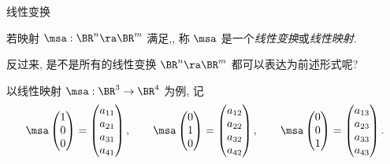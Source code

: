 \begin{frame}{线性变换\noexer}
	\onslide<+->
	\begin{definition}
		若映射 $\msa:\BR^n\ra\BR^m$ 满足,, 称 $\msa$ 是一个\emph{线性变换}或\emph{线性映射}.
	\end{definition}
	\onslide<+->
	反过来, 是不是所有的线性变换 $\BR^n\ra\BR^m$ 都可以表达为前述形式呢?

	\onslide<+->
	以线性映射 $\msa:\BR^3\to\BR^4$ 为例,
	\onslide<+->
	记
	\[\msa\begin{pmatrix}
		1\\0\\0
	\end{pmatrix}=\begin{pmatrix}
		a_{11}\\a_{21}\\a_{31}\\a_{41}
	\end{pmatrix},\qquad
	\msa\begin{pmatrix}
		0\\1\\0
	\end{pmatrix}=\begin{pmatrix}
		a_{12}\\a_{22}\\a_{32}\\a_{42}
	\end{pmatrix},\qquad
	\msa\begin{pmatrix}
		0\\0\\1
	\end{pmatrix}=\begin{pmatrix}
		a_{13}\\a_{23}\\a_{33}\\a_{43}
	\end{pmatrix}.\]
\end{frame}


